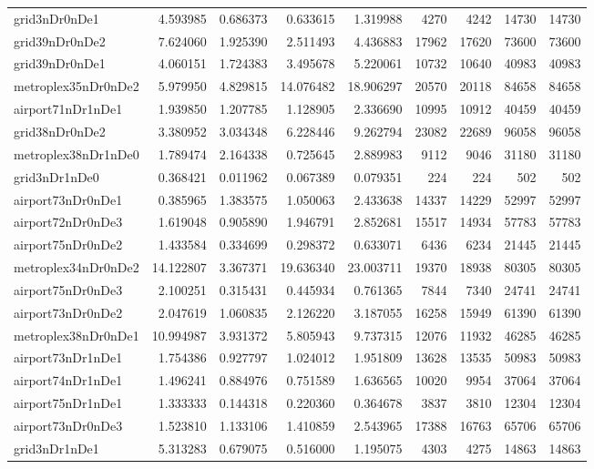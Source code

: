 \begin{longtable}{|l|r|r|r|r|r|r|r|r|}
grid3nDr0nDe1 & 4.593985 & 0.686373 & 0.633615 & 1.319988 & 4270 & 4242 & 14730 & 14730 \\
grid39nDr0nDe2 & 7.624060 & 1.925390 & 2.511493 & 4.436883 & 17962 & 17620 & 73600 & 73600 \\
grid39nDr0nDe1 & 4.060151 & 1.724383 & 3.495678 & 5.220061 & 10732 & 10640 & 40983 & 40983 \\
metroplex35nDr0nDe2 & 5.979950 & 4.829815 & 14.076482 & 18.906297 & 20570 & 20118 & 84658 & 84658 \\
airport71nDr1nDe1 & 1.939850 & 1.207785 & 1.128905 & 2.336690 & 10995 & 10912 & 40459 & 40459 \\
grid38nDr0nDe2 & 3.380952 & 3.034348 & 6.228446 & 9.262794 & 23082 & 22689 & 96058 & 96058 \\
metroplex38nDr1nDe0 & 1.789474 & 2.164338 & 0.725645 & 2.889983 & 9112 & 9046 & 31180 & 31180 \\
grid3nDr1nDe0 & 0.368421 & 0.011962 & 0.067389 & 0.079351 & 224 & 224 & 502 & 502 \\
airport73nDr0nDe1 & 0.385965 & 1.383575 & 1.050063 & 2.433638 & 14337 & 14229 & 52997 & 52997 \\
airport72nDr0nDe3 & 1.619048 & 0.905890 & 1.946791 & 2.852681 & 15517 & 14934 & 57783 & 57783 \\
airport75nDr0nDe2 & 1.433584 & 0.334699 & 0.298372 & 0.633071 & 6436 & 6234 & 21445 & 21445 \\
metroplex34nDr0nDe2 & 14.122807 & 3.367371 & 19.636340 & 23.003711 & 19370 & 18938 & 80305 & 80305 \\
airport75nDr0nDe3 & 2.100251 & 0.315431 & 0.445934 & 0.761365 & 7844 & 7340 & 24741 & 24741 \\
airport73nDr0nDe2 & 2.047619 & 1.060835 & 2.126220 & 3.187055 & 16258 & 15949 & 61390 & 61390 \\
metroplex38nDr0nDe1 & 10.994987 & 3.931372 & 5.805943 & 9.737315 & 12076 & 11932 & 46285 & 46285 \\
airport73nDr1nDe1 & 1.754386 & 0.927797 & 1.024012 & 1.951809 & 13628 & 13535 & 50983 & 50983 \\
airport74nDr1nDe1 & 1.496241 & 0.884976 & 0.751589 & 1.636565 & 10020 & 9954 & 37064 & 37064 \\
airport75nDr1nDe1 & 1.333333 & 0.144318 & 0.220360 & 0.364678 & 3837 & 3810 & 12304 & 12304 \\
airport73nDr0nDe3 & 1.523810 & 1.133106 & 1.410859 & 2.543965 & 17388 & 16763 & 65706 & 65706 \\
grid3nDr1nDe1 & 5.313283 & 0.679075 & 0.516000 & 1.195075 & 4303 & 4275 & 14863 & 14863 \\

\end{longtable}
